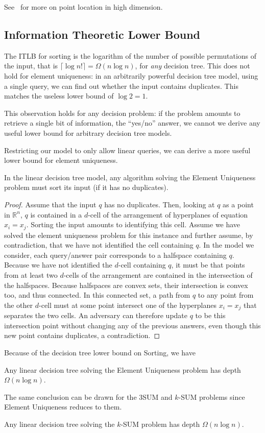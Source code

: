 See~\cite[Section~34.6]{Sn04} for more on point location in high dimension.

\subsection{Information Theoretic Lower Bound}%
\label{sec:history:sum:itlb}

The ITLB for sorting is the logarithm of the number of possible
permutations of the input, that is \(\lceil \log n! \rceil = \Omega(n \log
n)\), for \emph{any} decision tree. This does not hold for element uniqueness:
in an arbitrarily powerful decision tree model, using a single query, we can
find out whether the input contains duplicates. This matches the useless lower
bound of \(\log 2 = 1\).

This observation holds for any decision problem: if the problem amounts to
retrieve a single bit of information, the ``yes/no'' answer, we cannot we derive
any useful lower bound for arbitrary decision tree models.

Restricting our model to only allow linear queries,
we can derive a more useful lower bound for element uniqueness.
\begin{lemma}
	In the linear decision tree model,
	any algorithm solving the
	Element Uniqueness problem
	must
	sort its input (if it has no duplicates).
\end{lemma}
\begin{proof}
	Assume that the input \(q\) has no duplicates.
	Then, looking at \(q\) as a point in \(\mathbb{R}^n\), \(q\) is contained
	in a \(d\)-cell of the arrangement of hyperplanes of equation
	\(x_i = x_j\).
	Sorting the input amounts to identifying this cell.
	Assume we have solved the element uniqueness problem for this instance
	and further assume, by contradiction,
	that we have not identified the cell containing \(q\).
	In the model we consider, each query/answer pair corresponds to a halfspace
	containing \(q\).
	Because we have not identified the \(d\)-cell containing \(q\), it must be
	that points from at least two \(d\)-cells of the arrangement are contained
	in the intersection of the halfspaces.
	Because halfspaces are convex sets, their intersection is convex too, and
	thus connected. In this connected set, a path
	from \(q\) to any point from the other \(d\)-cell must at some point
	intersect one of the hyperplanes \(x_i = x_j\) that separates the two
	cells.
	An adversary can therefore update \(q\) to be this intersection point
	without changing any of the previous answers, even though this new point
	contains duplicates, a contradiction.
\end{proof}
%
Because of the decision tree lower bound on Sorting, we have
%
\begin{corollary}
	Any linear decision tree solving the
	Element Uniqueness problem
	has depth \(\Omega(n \log n)\).
\end{corollary}
%
The same conclusion can be drawn for the 3SUM and \(k\)-SUM problems since
Element Uniqueness reduces to them.
%
\begin{corollary}
	Any linear decision tree solving the
	\(k\)-SUM problem
	has depth \(\Omega(n \log n)\).
\end{corollary}


